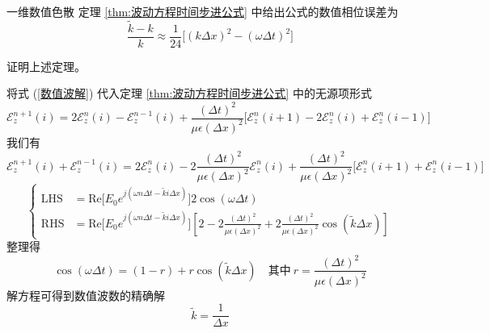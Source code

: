 \begin{theorem}{一维数值色散}
    定理 \ref{thm:波动方程时间步进公式} 中给出公式的数值相位误差为
    \begin{equation}
        \frac{\tilde{k}-k}{k}
        \approx\frac{1}{24}\Big[(k\Delta x)^2-(\omega \Delta t)^2\Big]
    \end{equation}
\end{theorem}

\begin{exercise}
    证明上述定理。
\end{exercise}

\begin{solution}
    将式 (\ref{数值波解}) 代入定理 \ref{thm:波动方程时间步进公式} 中的无源项形式
    \begin{equation*}
        \mathscr{E}_z^{n+1}(i)=2\mathscr{E}_z^n(i)-\mathscr{E}_z^{n-1}(i)
        +\frac{(\Delta t)^2}{\mu \epsilon (\Delta x)^2}
        \Big[\mathscr{E}_z^n(i+1)-2\mathscr{E}_z^n(i)+\mathscr{E}_z^n(i-1)\Big]
    \end{equation*}
    我们有
    \begin{equation*}
        \mathscr{E}_z^{n+1}(i)+\mathscr{E}_z^{n-1}(i)=2\mathscr{E}_z^n(i)
        -2\frac{(\Delta t)^2}{\mu \epsilon (\Delta x)^2}\mathscr{E}_z^n(i)
        +\frac{(\Delta t)^2}{\mu \epsilon (\Delta x)^2}
        \Big[\mathscr{E}_z^n(i+1)+\mathscr{E}_z^n(i-1)\Big]
    \end{equation*}
    \begin{equation*}
        \left\{
            \begin{aligned}
                \text{LHS}&=\text{Re}\Big[E_0e^{j(\omega n \Delta t-\tilde{k} i\Delta x)}\Big]
                2\cos(\omega\Delta t)\\
                \text{RHS}&=\text{Re}\Big[E_0e^{j(\omega n \Delta t-\tilde{k} i\Delta x)}\Big]
                \left[2-2\frac{(\Delta t)^2}{\mu \epsilon (\Delta x)^2}+2\frac{(\Delta t)^2}{\mu \epsilon (\Delta x)^2}
                \cos(\tilde{k}\Delta x)\right]
            \end{aligned}
        \right.
    \end{equation*}
    整理得
    \begin{equation*}
        \cos(\omega \Delta t)=(1-r)+r\cos(\tilde{k}\Delta x) 
        \quad \text{其中} \ r=\frac{(\Delta t)^2}{\mu \epsilon (\Delta x)^2}
    \end{equation*}
    解方程可得到数值波数的精确解
    \begin{equation*}
        \tilde{k}=\frac{1}{\Delta x}

\end{equation*}
\end{solution}
